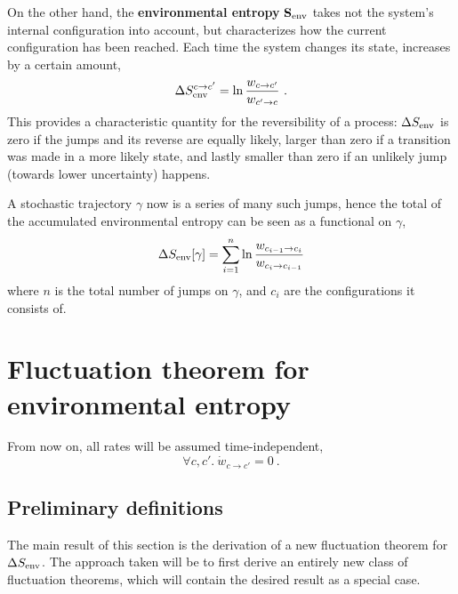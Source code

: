 On the other hand, the \textbf{environmental entropy} \(\mathbf{S_\text{env}{}}\) takes not the system's internal configuration into account, but characterizes how the current configuration has been reached. Each time the system changes its state, \SEnv{} increases by a certain amount,
%
\begin{align}
	\label{eqn:SEnv single jump definition}
	\Delta S_\text{env}^{c\to c'} = \ln\frac{w_{c\to c'}}{w_{c'\to c}} ~.
\end{align}
%
This provides a characteristic quantity for the reversibility of a process: \(\Delta S_\text{env}\) is zero if the jumps and its reverse are equally likely, larger than zero if a transition was made in a more likely state, and lastly smaller than zero if an unlikely jump (towards lower uncertainty) happens.

A stochastic trajectory \(\gamma\) now is a series of many such jumps, hence the total of the accumulated environmental entropy can be seen as a functional on \(\gamma\),
%
\begin{align}
	\label{eqn:SEnv rate jump functional}
	\Delta S_\text{env}[\gamma] = \sum_{i=1}^n\ln\frac{w_{c_{i-1}\to c_i}}{w_{c_i\to c_{i-1}}}
\end{align}
%
where \(n\) is the total number of jumps on \(\gamma\), and \(c_i\) are the configurations it consists of.




\section{Fluctuation theorem for environmental entropy}


From now on, all rates will be assumed time-independent,
\begin{equation}
	\forall c, c'.~ \dot w_{c\to c'} = 0 ~.
\end{equation}



\subsection{Preliminary definitions}

The main result of this section is the derivation of a new fluctuation theorem for \(\Delta S_\text{env}\). The approach taken will be to first derive an entirely new class of fluctuation theorems, which will contain the desired result as a special case.


